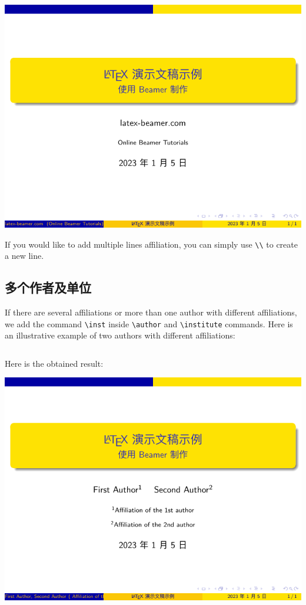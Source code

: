 \includegraphics{examples/beamer/title-page-affliation.pdf}

If you would like to add multiple lines affiliation, you can simply use \verb|\\| to create a new line.

\subsection{多个作者及单位}

If there are several affiliations or more than one author with different affiliations, we add the command \verb|\inst| inside \verb|\author| and \verb|\institute| commands. Here is an illustrative example of two authors with different affiliations:

\inputminted[linenos=true]{latex}{examples/beamer/title-page-multiple-affliations.tex}

Here is the obtained result:

\includegraphics{examples/beamer/title-page-multiple-affliations.pdf}

